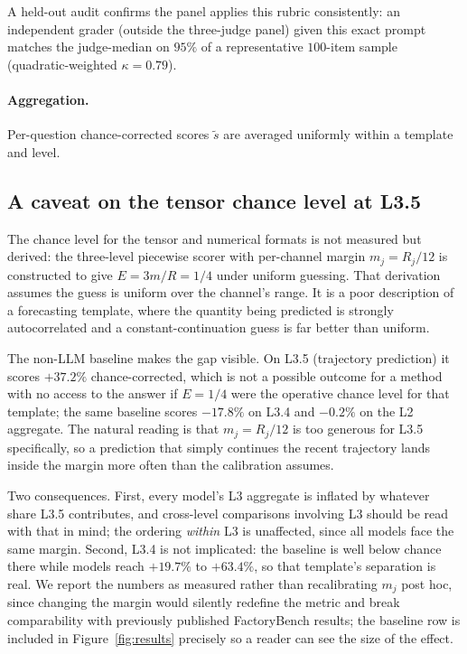 \noindent A held-out audit confirms the panel applies this rubric consistently: an independent grader (outside the three-judge panel) given this exact prompt matches the judge-median on $95\%$ of a representative $100$-item sample (quadratic-weighted $\kappa=0.79$).

\paragraph{Aggregation.} Per-question chance-corrected scores $\tilde{s}$ are averaged uniformly within a template and level.

\subsection{A caveat on the tensor chance level at L3.5}
\label{app:l3-tensor-caveat}

The chance level for the tensor and numerical formats is not measured but
derived: the three-level piecewise scorer with per-channel margin
$m_j = R_j/12$ is constructed to give $E = 3m/R = 1/4$ under uniform guessing.
That derivation assumes the guess is uniform over the channel's range. It is a
poor description of a forecasting template, where the quantity being predicted
is strongly autocorrelated and a constant-continuation guess is far better than
uniform.

The non-LLM baseline makes the gap visible. On L3.5 (trajectory prediction) it
scores $+37.2\%$ chance-corrected, which is not a possible outcome for a method
with no access to the answer if $E = 1/4$ were the operative chance level for
that template; the same baseline scores $-17.8\%$ on L3.4 and $-0.2\%$ on the L2
aggregate. The natural reading is that $m_j = R_j/12$ is too generous for L3.5
specifically, so a prediction that simply continues the recent trajectory lands
inside the margin more often than the calibration assumes.

Two consequences. First, every model's L3 aggregate is inflated by whatever
share L3.5 contributes, and cross-level comparisons involving L3 should be read
with that in mind; the ordering \emph{within} L3 is unaffected, since all models
face the same margin. Second, L3.4 is not implicated: the baseline is well below
chance there while models reach $+19.7\%$ to $+63.4\%$, so that template's
separation is real. We report the numbers as measured rather than recalibrating
$m_j$ post hoc, since changing the margin would silently redefine the metric and
break comparability with previously published FactoryBench results; the baseline
row is included in Figure~\ref{fig:results} precisely so a reader can see the
size of the effect.

